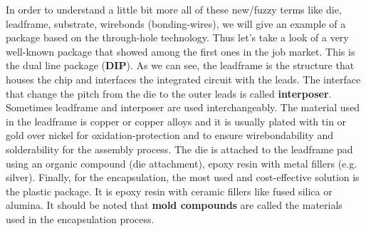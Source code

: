 \documentclass[final]{cubedoc}
\begin{document}
	In order to understand a little bit more all of these new/fuzzy terms like die, leadframe, substrate, wirebonds (bonding-wires), we will give an example of a package based on the through-hole technology. Thus let's take a look of a very well-known package that showed among the first ones in the job market. This is the dual line package (\textbf{DIP}). As we can see, the leadframe is the structure that houses the chip and interfaces the integrated circuit with the leads. The interface that change the pitch from the die to the outer leads is called \textbf{interposer}. Sometimes leadframe and interposer are used interchangeably. The material used in the leadframe is copper or copper alloys and it is usually plated with tin or gold over nickel for oxidation-protection and to ensure wirebondability and solderability for the assembly process. The die is attached to the leadframe pad using an organic compound (die attachment), epoxy resin with metal fillers (e.g. silver). Finally, for the encapsulation, the most used and cost-effective solution is the plastic package. It is epoxy resin with ceramic fillers like fused silica or alumina. It should be noted that \textbf{mold compounds} are called the materials used in the encapsulation process. 
	
	
\end{document}
